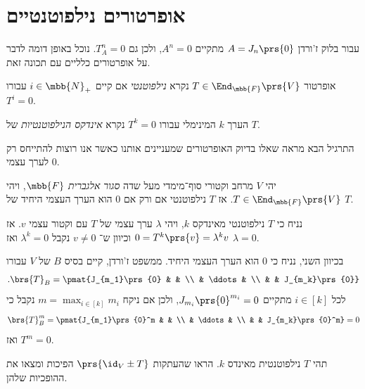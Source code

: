 \documentclass[a4paper,10pt,twoside,openany]{book}
\begin{document}
\section{אופרטורים נילפוטנטיים}

עבור בלוק ז'ורדן
$A = J_n\prs{0}$
מתקיים
$A^n = 0$,
ולכן גם
$T_A^n = 0$.
נוכל באופן דומה לדבר על אופרטורים כלליים עם תכונה זאת.

\begin{definition}
אופרטור
$T \in \End_{\mbb{F}}\prs{V}$
נקרא
\emph{נילפוטנטי}
אם קיים
$i \in \mbb{N}_+$
עבורו
$T^i = 0$.

הערך
$k$
המינימלי עבורו
$T^k = 0$
נקרא
\emph{אינדקס הנילפוטנטיות}
של
$T$.
\end{definition}

התרגיל הבא מראה שאלו בדיוק האופרטורים שמעניינים אותנו כאשר אנו רוצות להתייחס רק לערך עצמי
$0$.

\begin{exercisechap}
יהי
$V$
מרחב וקטורי סוף־מימדי מעל שדה
\emph{סגור אלגברית}
$\mbb{F}$,
ויהי
$T \in \End_{\mbb{F}}\prs{V}$.
אז
$T$
נילפוטנטי אם ורק אם
$0$
הוא הערך העצמי היחיד של
$T$.
\end{exercisechap}

\begin{solution}
נניח כי
$T$
נילפוטנטי מאינדקס
$k$, ויהי
$\lambda$
ערך עצמי של
$T$
עם וקטור עצמי
$v$.
אז
$0 = T^k\prs{v} = \lambda^k v$
וכיוון ש־%
$v \neq 0$
נקבל
$\lambda^k = 0$
ואז
$\lambda = 0$.

בכיוון השני, נניח כי
$0$
הוא הערך העצמי היחיד.
ממשפט ז'ורדן, קיים בסיס
$B$
של
$V$
עבורו
\begin{align*}
\text{.} \brs{T}_B = \pmat{J_{m_1}\prs{0} & & \\ & \ddots & \\ & & J_{m_k}\prs{0}}
\end{align*}
לכל
$i \in [k]$
מתקיים
$J_{m_i}\prs{0}^{m_i} = 0$,
ולכן אם ניקח
$m = \max_{i \in [k]} m_i$
נקבל כי
\begin{align*}
\brs{T}_B^m = \pmat{J_{m_1}\prs{0}^m & & \\ & \ddots & \\ & & J_{m_k}\prs{0}^m} = 0
\end{align*}
ואז
$T^m = 0$.
\end{solution}

\begin{exercisechap}
תהי
$T$
נילפוטנטית מאינדס
$k$.
הראו שהעתקות
$\prs{\id_V \pm T}$
הפיכות ומצאו את ההופכיות שלהן.
\end{exercisechap}
\end{document}
